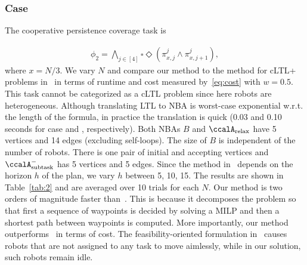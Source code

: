 \documentclass[Afour,sageh,times]{sagej}
\newcommand{\auto}[1]{\ccalA_{\textup{#1}}}
\renewcommand{\ap}[3]{\mathcal{\pi}_{{#1},{#2}}^{#3}}
\newcommand{\RNum}[1]{\uppercase\expandafter{\romannumeral #1\relax}}
\begin{document}
{{\subsubsection{Case \RNum{1}} {The cooperative persistence coverage task is}

\small
\begin{align*}
   \phi_2 = \bigwedge\nolimits_{j\in[4]} \square \Diamond( \ap{x}{j}{j} \wedge \ap{x}{j+1}{j} ) ,
\end{align*}
\normalsize
where $x = N/3$. We vary $N$ and compare our method to the method for cLTL+ problems in~\cite{sahin2019multirobot} in terms of runtime and cost measured by~\eqref{eq:cost} with $w=0.5$. This task cannot be categorized as a cLTL problem since here robots are heterogeneous. {Although translating LTL to NBA is worst-case exponential w.r.t. the length of the formula, in practice the translation is quick (0.03 and 0.10 seconds for case \RNum{1} and \RNum{2}, respectively). Both NBAs $B$ and $\auto{relax}$ have 5 vertices and 14 edges (excluding self-loops). The size of $B$ is independent of the number of robots. There is one pair of initial and accepting vertices and  $\auto{subtask}^-$ has 5 vertices and 5 edges.} Since the method in~\cite{sahin2019multirobot} depends on the horizon $h$ of the plan, we vary $h$ between 5, 10, 15. The results  are shown in Table~\ref{tab:2} and are averaged over 10 trials for each $N$. Our method is two orders of magnitude faster than~\cite{sahin2019multirobot}. This is because it decomposes the problem so that first a sequence of waypoints is decided by solving a MILP and then a shortest path  between waypoints is computed. More importantly, our method outperforms~\cite{sahin2019multirobot} in terms of cost.  The feasibility-oriented formulation in~\cite{sahin2019multirobot} causes robots that are not assigned to any task to move aimlessly, while in our solution, such robots remain idle.

}}
\end{document}
